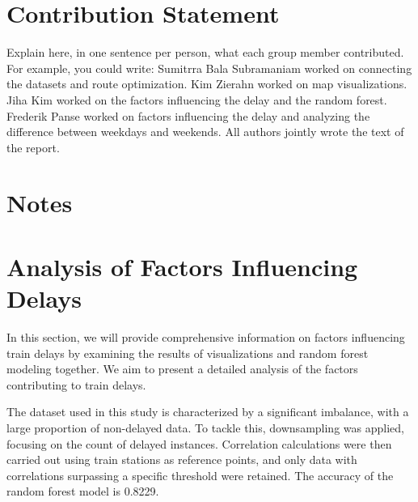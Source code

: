 \documentclass{article}
\theoremstyle{plain}
\theoremstyle{definition}
\theoremstyle{remark}
\begin{document}
\section*{Contribution Statement}

Explain here, in one sentence per person, what each group member contributed. For example, you could write: Sumitrra Bala Subramaniam worked on connecting the datasets and route optimization. Kim Zierahn worked on map visualizations. Jiha Kim worked on the factors influencing the delay and the random forest. Frederik Panse worked on factors influencing the delay and analyzing the difference between weekdays and weekends. All authors jointly wrote the text of the report.

\section*{Notes}

\section{Analysis of Factors Influencing Delays}

In this section, we will provide comprehensive information on factors influencing train delays by examining the results of visualizations and random forest modeling together. We aim to present a detailed analysis of the factors contributing to train delays.

The dataset used in this study is characterized by a significant imbalance, with a large proportion of non-delayed data. To tackle this, downsampling was applied, focusing on the count of delayed instances. Correlation calculations were then carried out using train stations as reference points, and only data with correlations surpassing a specific threshold were retained. The accuracy of the random forest model is 0.8229.
\end{document}

